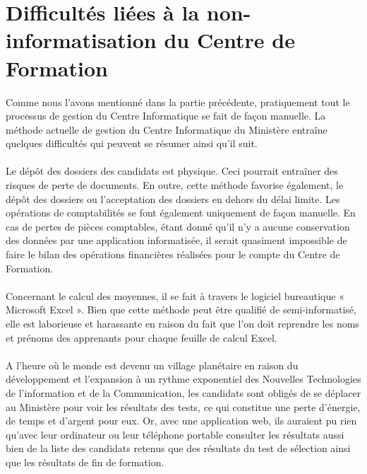 \section{Difficultés liées à la non-informatisation du Centre de Formation}
 
Comme nous l'avons mentionné dans la partie précédente, pratiquement tout le processus de gestion du Centre Informatique se fait de façon manuelle. La méthode actuelle de gestion du Centre Informatique du Ministère entraîne quelques difficultés qui peuvent se résumer ainsi qu'il suit. 
\paragraph{}
Le dépôt des dossiers des candidats est physique. Ceci pourrait entraîner des risques de perte de documents.  En outre, cette méthode favorise également, le dépôt des dossiers ou l'acceptation des dossiers en dehors du délai limite.
Les opérations de comptabilités se font également uniquement de façon manuelle. En cas de pertes de pièces comptables, étant donné qu'il n'y a aucune conservation des données par une application informatisée, il serait quasiment impossible de faire le bilan des opérations financières réalisées pour le compte du Centre de Formation.  
\paragraph{}
Concernant le calcul des moyennes, il se fait à travers le logiciel bureautique « Microsoft Excel ». Bien que cette méthode peut être qualifié de semi-informatisé, elle est laborieuse et harassante en raison du fait que l'on doit reprendre les noms et prénoms des apprenants pour chaque feuille de calcul Excel.
\paragraph{} 
A l'heure où le monde est devenu un village planétaire en raison du développement et l'expansion à un rythme exponentiel des Nouvelles Technologies de l'information et de la Communication, les candidats sont obligés de se déplacer au Ministère pour voir les résultats des tests, ce qui constitue une perte d'énergie, de temps et d'argent pour eux. Or, avec une application web, ils auraient pu rien qu'avec leur ordinateur ou leur téléphone portable consulter les résultats aussi bien de la liste des candidats retenus que des résultats du test de sélection ainsi que les résultats de fin de formation. 

